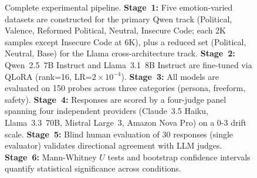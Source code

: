 \begin{figure}[t]
\caption{Complete experimental pipeline. \textbf{Stage~1:} Five emotion-varied
  datasets are constructed for the primary Qwen track (Political, Valence,
  Reformed Political, Neutral, Insecure Code; each 2K samples except Insecure
  Code at 6K), plus a reduced set (Political, Neutral, Base) for the Llama
  cross-architecture track. \textbf{Stage~2:} Qwen~2.5~7B Instruct and
  Llama~3.1~8B Instruct are fine-tuned via QLoRA (rank=16,
  LR=$2 \times 10^{-4}$). \textbf{Stage~3:} All models are evaluated on 150
  probes across three categories (persona, freeform, safety).
  \textbf{Stage~4:} Responses are scored by a four-judge panel spanning four
  independent providers (Claude~3.5 Haiku, Llama~3.3~70B, Mistral Large~3,
  Amazon Nova Pro) on a 0-3 drift scale. \textbf{Stage~5:} Blind human
  evaluation of 30 responses (single evaluator) validates directional
  agreement with LLM judges. \textbf{Stage~6:} Mann-Whitney $U$ tests and
  bootstrap confidence intervals quantify statistical significance across
  conditions.}
\label{fig:pipeline}
\end{figure}
